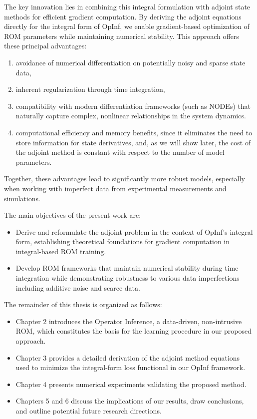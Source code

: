 The key innovation lies in combining this integral formulation with adjoint state methods for efficient gradient computation. By deriving the adjoint equations directly for the integral form of OpInf, we enable gradient-based optimization of ROM parameters while maintaining numerical stability. This approach offers these principal advantages: 

\begin{enumerate}[label=(\roman*)]
  \item avoidance of numerical differentiation on potentially noisy and sparse state data,
  \item inherent regularization through time integration, 
  \item compatibility with modern differentiation frameworks (such as NODEs) that naturally capture complex, nonlinear relationships in the system dynamics.
  \item computational efficiency and memory benefits, since it eliminates the need to store information for state derivatives, and, as we will show later, the cost of the adjoint method is constant with respect to the number of model parameters.
\end{enumerate}

 Together, these advantages lead to significantly more robust models, especially when working with imperfect data from experimental measurements and simulations.

\newpage

The main objectives of the present work are:
\begin{itemize}
    \item Derive and reformulate the adjoint problem in the context of OpInf's integral form, establishing theoretical foundations for gradient computation in integral-based ROM training.
    \item Develop ROM frameworks that maintain numerical stability during time integration while demonstrating robustness to various data imperfections including additive noise and scarce data.
\end{itemize}

The remainder of this thesis is organized as follows:
\begin{itemize}
    \item Chapter 2 introduces the Operator Inference, a data-driven, non-intrusive ROM, which constitutes the basis for the learning procedure in our proposed approach.
    \item Chapter 3 provides a detailed derivation of the adjoint method equations used to minimize the integral-form loss functional in our OpInf framework.
    \item Chapter 4 presents numerical experiments validating the proposed method.
    \item Chapters 5 and 6 discuss the implications of our results, draw conclusions, and outline potential future research directions.
\end{itemize}




